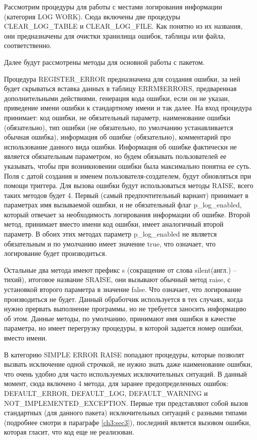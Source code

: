Рассмотрим процедуры для работы с местами логирования информации (категория LOG WORK). Сюда включены две процедуры CLEAR\_LOG\_TABLE и CLEAR\_LOG\_FILE. Как понятно из их названия, они предназначены для очистки хранилища ошибок, таблицы или файла, соответственно. 

Далее будут рассмотрены методы для основной работы с пакетом. 

Процедура REGISTER\_ERROR предназначена для создания ошибки, за ней будет скрываться вставка данных в таблицу ERRM\$ERRORS, предваренная дополнительными действиями, генерация кода ошибки, если он не указан, приведение имени ошибки к стандартному имени и так далее. На вход процедура принимает: код ошибки, не обязательный параметр, наименование ошибки (обязательно), тип ошибки (не обязательно, по умолчанию устанавливается обычная ошибка), информация об ошибке (обязательно), комментарий про использование данного вида ошибки. Информация об ошибке фактически не является обязательным параметром, но будем обязывать пользователей ее указывать, чтобы при возникновении ошибки была максимально понятна ее суть. Поля с датой создания и именем пользователя-создателем, будут обновляться при помощи триггера. 
Для вызова ошибки будут использоваться методы RAISE, всего таких методов будет 4. Первый (самый предпочтительный вариант) принимает в параметрах имя вызываемой ошибки, и не обязательный флаг p\_log\_enabled, который отвечает за необходимость логирования информации об ошибке. Второй метод, принимает вместо имени код ошибки, имеет аналогичный второй параметр. В обоих этих методах параметр p\_log\_enabled не является обязательным и по умолчанию имеет значение true, что означает, что логирование будет производиться. 

Остальные два метода имеют префикс s (сокращение от слова silent(англ.) – тихий), итоговое название SRAISE, они вызывают обычный метод raise, с установкой второго параметра в значение false. Что означает, что логирование производиться не будет. Данный обработчик используется в тех случаях, когда нужно прервать выполнение программы, но не требуется заносить информацию об этом. Данные методы, по умолчанию, принимают имя ошибки в качестве параметра, но имеет перегрузку процедуры, в которой задается номер ошибки, вместо имени. 

В категорию SIMPLE ERROR RAISE попадают процедуры, которые позволят вызвать исключение одной строчкой, не нужно знать даже наименование ошибки, что очень удобно для часто используемых исключительных ситуаций. В данный момент, сюда включено 4 метода, для заранее предопределенных ошибок: DEFAULT\_ERROR, DEFAULT\_LOG, DEFAULT\_WARNING и NOT\_IMPLEMENTED\_EXCEPTION. Первые три представляют собой вызов стандартных (для данного пакета) исключительных ситуаций с разными типами (подробнее смотри в параграфе \ref{ch3:sec3}), последний является вызовом ошибки, которая гласит, что код еще не реализован. 

